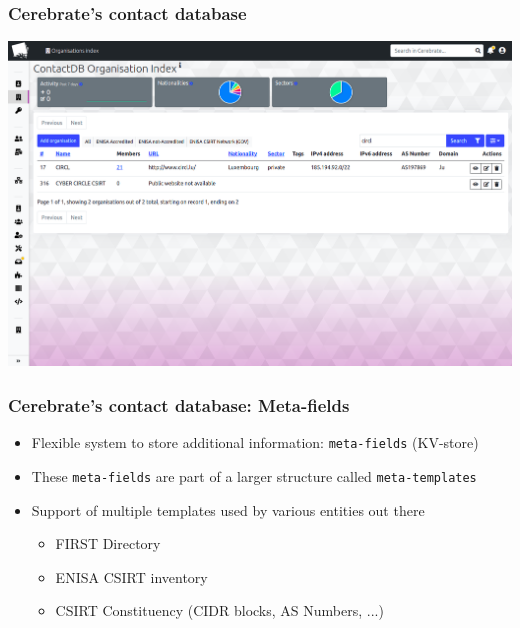 \begin{frame}
\frametitle{Cerebrate's contact database}
    \begin{center}
        \includegraphics[width=0.99\linewidth]{pictures/contact-database-2.png}
    \end{center}
\end{frame}

\begin{frame}
\frametitle{Cerebrate's contact database: Meta-fields}
    \begin{itemize}
        \item Flexible system to store additional information: \texttt{meta-fields} (KV-store)
        \item These \texttt{meta-fields} are part of a larger structure called \texttt{meta-templates}
        \item Support of multiple templates used by various entities out there
        \begin{itemize}
            \item FIRST Directory
            \item ENISA CSIRT inventory
            \item CSIRT Constituency (CIDR blocks, AS Numbers, ...)
        \end{itemize}
    \end{itemize}
\end{frame}

